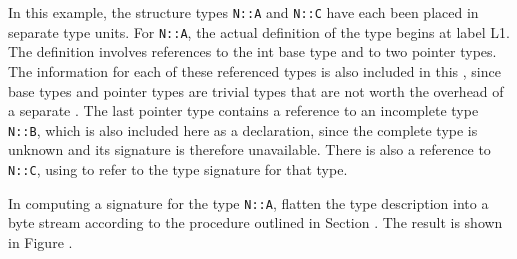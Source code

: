 In this example, the structure types \texttt{N::A} and \texttt{N::C} have each
been placed in separate 
type units.  For \texttt{N::A}, the actual
definition of the type begins at label L1. The definition
involves references to the int base type and to two pointer
types. The information for each of these referenced types is
also included in this , 
since base types and pointer
types are trivial types that are not worth the overhead of a
separate . 
The last pointer type contains a reference
to an incomplete type \texttt{N::B}, which is also included here as
a declaration, since the complete type is unknown and its
signature is therefore unavailable. There is also a reference
to \texttt{N::C}, using 
 to 
refer to the type signature
for that type.

In computing a signature for the type \texttt{N::A}, flatten the type
description into a byte stream according to the procedure
outlined in 
Section .
The result is shown in 
Figure .


